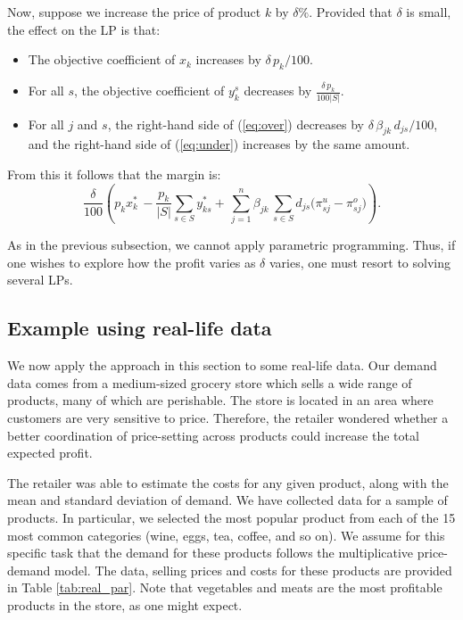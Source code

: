 \documentclass[a4paper,11pt]{article}
\begin{document}
Now, suppose we increase the price of product $k$ by $\delta \%$. Provided that $\delta$ is small, the effect on the LP is that:
\begin{itemize}
\item The objective coefficient of $x_k$ increases by $\delta \, p_k / 100$.
\item For all $s$, the objective coefficient of $y_k^s$ decreases by $\frac{\delta \, p_k}{100 |S|}$.
\item For all $j$ and $s$, the right-hand side of (\ref{eq:over}) decreases by $\delta \, \beta_{jk} \, d_{js}/100$, and the right-hand side of (\ref{eq:under}) increases by the same amount.
\end{itemize}
From this it follows that the margin is:
\[
\frac{\delta}{100} \left(
p_k x^*_k \, - \frac{p_k}{|S|} \sum_{s \in S} y^*_{ks}+ \,
\sum_{j=1}^n \beta_{jk} \, \sum_{s \in S} d_{js} \big( \pi_{sj}^u - \pi_{sj}^o \big)
\right).
\]

As in the previous subsection, we cannot apply parametric programming. Thus, if one wishes to explore how the profit varies as $\delta$ varies, one must resort to solving several LPs.

\subsection{Example using real-life data}
\label{sub:price3}

We now apply the approach in this section to some real-life data. Our demand data comes from a medium-sized grocery store which sells a wide range of products, many of which are perishable. The store is located in an area where customers are very sensitive to price. Therefore, the retailer wondered whether a better coordination of price-setting across products could increase the total expected profit.

The retailer was able to estimate the costs for any given product, along with the mean and standard deviation of demand. We have collected data for a sample of products. In particular, we selected the most popular product from each of the 15 most common categories (wine, eggs, tea, coffee, and so on). We assume for this specific task that the demand for these products follows the multiplicative price-demand model. The data, selling prices and costs for these products are provided in Table \ref{tab:real_par}. Note that vegetables and meats are the most profitable products in the store, as one might expect.
\end{document}
